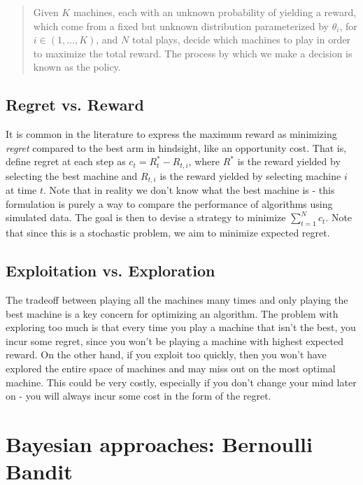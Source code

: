 \documentclass{article}
\begin{document}
\begin{quote}
Given $K$ machines, each with an unknown probability of yielding a reward, which come from a fixed but unknown distribution parameterized by $\theta_i$, for $i \in (1, ..., K)$, and $N$ total plays, decide which machines to play in order to maximize the total reward. The process by which we make a decision is known as the policy.
\end{quote}



\subsection{Regret vs. Reward}

It is common in the literature to express the maximum reward as minimizing \textit{regret} compared to the best arm in hindsight, like an opportunity cost. That is, define regret at each step as $c_{t} = R^*_{t} - R_{t,i}$, where $R^*$ is the reward yielded by selecting the best machine and $R_{t,i}$ is the reward yielded by selecting machine $i$ at time $t$. Note that in reality we don't know what the best machine is - this formulation is purely a way to compare the performance of algorithms using simulated data. The goal is then to devise a strategy to minimize $\sum_{t=1}^N c_{t}$. Note that since this is a stochastic problem, we aim to minimize expected regret.\\

\subsection{Exploitation vs. Exploration}

The tradeoff between playing all the machines many times and only playing the best machine is a key concern for optimizing an algorithm. The problem with exploring too much is that every time you play a machine that isn't the best, you incur some regret, since you won't be playing a machine with highest expected reward. On the other hand, if you exploit too quickly, then you won't have explored the entire space of machines and may miss out on the most optimal machine. This could be very costly, especially if you don't change your mind later on - you will always incur some cost in the form of the regret.\\

\section{Bayesian approaches: Bernoulli Bandit}
\end{document}
